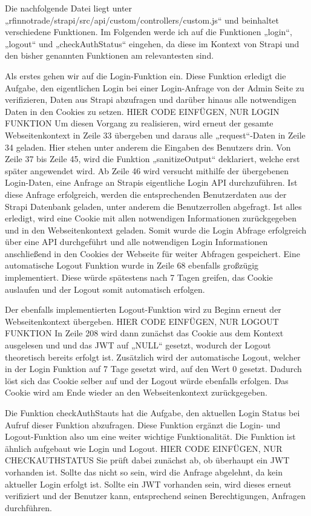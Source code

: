 Die nachfolgende Datei liegt unter „rfinnotrade/strapi/src/api/custom/controllers/custom.js“ und beinhaltet verschiedene Funktionen. Im Folgenden werde ich auf die Funktionen „login“, „logout“ und „checkAuthStatus“ eingehen, da diese im Kontext von Strapi und den bisher genannten Funktionen am relevantesten sind.

Als erstes gehen wir auf die Login-Funktion ein. Diese Funktion erledigt die Aufgabe, den eigentlichen Login bei einer Login-Anfrage von der Admin Seite zu verifizieren, Daten aus Strapi abzufragen und darüber hinaus alle notwendigen Daten in den Cookies zu setzen.
HIER CODE EINFÜGEN, NUR LOGIN FUNKTION
Um diesen Vorgang zu realisieren, wird erneut der gesamte Webseitenkontext in Zeile 33 übergeben und daraus alle „request“-Daten in Zeile 34 geladen. Hier stehen unter anderem die Eingaben des Benutzers drin.
Von Zeile 37 bis Zeile 45, wird die Funktion „sanitizeOutput“ deklariert, welche erst später angewendet wird.
Ab Zeile 46 wird versucht mithilfe der übergebenen Login-Daten, eine Anfrage an Strapis eigentliche Login API durchzuführen. Ist diese Anfrage erfolgreich, werden die entsprechenden Benutzerdaten aus der Strapi Datenbank geladen, unter anderem die Benutzerrollen abgefragt.
Ist alles erledigt, wird eine Cookie mit allen notwendigen Informationen zurückgegeben und in den Webseitenkontext geladen.
Somit wurde die Login Abfrage erfolgreich über eine API durchgeführt und alle notwendigen Login Informationen anschließend in den Cookies der Webseite für weiter Abfragen gespeichert. Eine automatische Logout Funktion wurde in Zeile 68 ebenfalls großzügig implementiert. Diese würde spätestens nach 7 Tagen greifen, das Cookie auslaufen und der Logout somit automatisch erfolgen.

Der ebenfalls implementierten Logout-Funktion wird zu Beginn erneut der Webseitenkontext übergeben.
HIER CODE EINFÜGEN, NUR LOGOUT FUNKTION
In Zeile 208 wird dann zunächst das Cookie aus dem Kontext ausgelesen und und das JWT auf „NULL“ gesetzt, wodurch der Logout theoretisch bereits erfolgt ist. Zusätzlich wird der automatische Logout, welcher in der Login Funktion auf 7 Tage gesetzt wird, auf den Wert 0 gesetzt.
Dadurch löst sich das Cookie selber auf und der Logout würde ebenfalls erfolgen. Das Cookie wird am Ende wieder an den Webseitenkontext zurückgegeben.

Die Funktion checkAuthStauts hat die Aufgabe, den aktuellen Login Status bei Aufruf dieser Funktion abzufragen. Diese Funktion ergänzt die Login- und Logout-Funktion also um eine weiter wichtige Funktionalität.
Die Funktion ist ähnlich aufgebaut wie Login und Logout.
HIER CODE EINFÜGEN, NUR CHECKAUTHSTATUS
Sie prüft dabei zunächst ab, ob überhaupt ein JWT vorhanden ist. Sollte das nicht so sein, wird die Anfrage abgelehnt, da kein aktueller Login erfolgt ist. Sollte ein JWT vorhanden sein, wird dieses erneut verifiziert und der Benutzer kann, entsprechend seinen Berechtigungen, Anfragen durchführen.